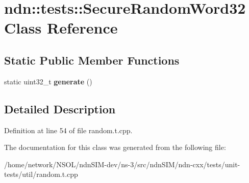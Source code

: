 \hypertarget{classndn_1_1tests_1_1SecureRandomWord32}{}\section{ndn\+:\+:tests\+:\+:Secure\+Random\+Word32 Class Reference}
\label{classndn_1_1tests_1_1SecureRandomWord32}
\subsection*{Static Public Member Functions}
\begin{DoxyCompactItemize}
\item 
static uint32\+\_\+t {\bfseries generate} ()\hypertarget{classndn_1_1tests_1_1SecureRandomWord32_a0d93773384e94d59241ce402b278d511}{}\label{classndn_1_1tests_1_1SecureRandomWord32_a0d93773384e94d59241ce402b278d511}

\end{DoxyCompactItemize}


\subsection{Detailed Description}


Definition at line 54 of file random.\+t.\+cpp.



The documentation for this class was generated from the following file\+:\begin{DoxyCompactItemize}
\item 
/home/network/\+N\+S\+O\+L/ndn\+S\+I\+M-\/dev/ns-\/3/src/ndn\+S\+I\+M/ndn-\/cxx/tests/unit-\/tests/util/random.\+t.\+cpp\end{DoxyCompactItemize}
